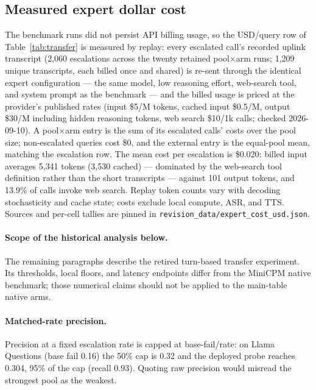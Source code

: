 \subsection{Measured expert dollar cost}
\label{app:expertcost}
The benchmark runs did not persist API billing usage, so the
USD/query row of Table~\ref{tab:transfer} is measured by replay: every
escalated call's recorded uplink transcript (2{,}060 escalations across
the twenty retained pool$\times$arm runs; 1{,}209 unique transcripts,
each billed once and shared) is re-sent through the identical expert
configuration --- the same model, low reasoning effort, web-search tool,
and system prompt as the benchmark --- and the billed usage is priced at
the provider's published rates (input \$5/M tokens, cached input
\$0.5/M, output \$30/M including hidden reasoning tokens, web search
\$10/1k calls; checked 2026-09-10). A pool$\times$arm entry is the sum
of its escalated calls' costs over the pool size; non-escalated queries
cost \$0, and the external entry is the equal-pool mean, matching the
escalation row. The mean cost per escalation is \$0.020: billed input
averages 5{,}341 tokens (3{,}530 cached) --- dominated by the web-search
tool definition rather than the short transcripts --- against 101 output
tokens, and 13.9\% of calls invoke web search. Replay token counts vary
with decoding stochasticity and cache state; costs exclude local
compute, ASR, and TTS. Sources and per-cell tallies are pinned in
\texttt{revision\_data/expert\_cost\_usd.json}.

\paragraph{Scope of the historical analysis below.}
The remaining paragraphs describe the retired turn-based transfer
experiment. Its thresholds, local floors, and latency endpoints
differ from the MiniCPM native benchmark; those numerical claims
should not be applied to the main-table native arms.

\paragraph{Matched-rate precision.} Precision at a fixed escalation
rate is capped at base-fail/rate: on Llama Questions (base fail 0.16)
the 50\% cap is 0.32 and the deployed probe reaches 0.304, 95\% of
the cap (recall 0.93). Quoting raw precision would misread the
strongest pool as the weakest.

